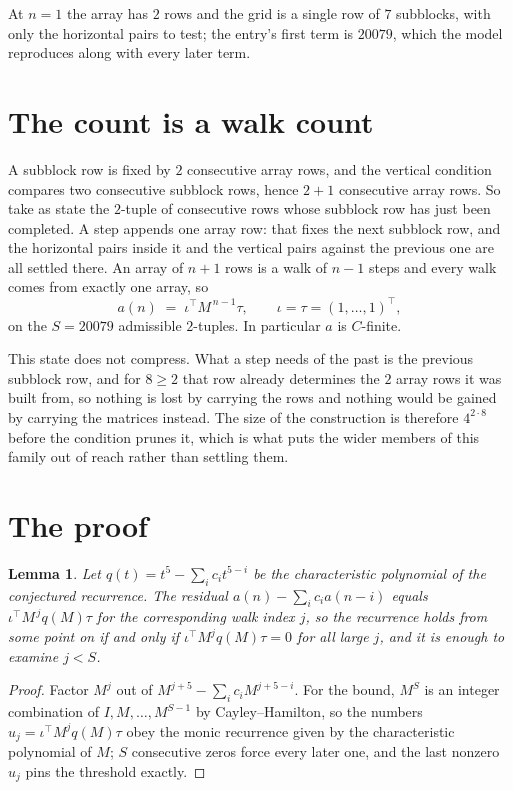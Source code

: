 \documentclass[11pt,a4paper]{article}
\theoremstyle{plain}
\newtheorem{lemma}[theorem]{Lemma}
\theoremstyle{definition}
\begin{document}
At $n=1$ the array has $2$ rows and the grid is a single row of $7$
subblocks, with only the horizontal pairs to test; the entry's first term is
$20079$, which the model reproduces along with every later term.

\section{The count is a walk count}

A subblock row is fixed by $2$ consecutive array rows, and the vertical condition compares
two consecutive subblock rows, hence $2+1$ consecutive array rows. So take as state the
$2$-tuple of consecutive rows whose subblock row has just been completed. A step appends one
array row: that fixes the next subblock row, and the horizontal pairs inside it and the
vertical pairs against the previous one are all settled there. An array of $n+1$ rows is
a walk of $n-1$ steps and every walk comes from exactly one array, so
\[
a(n)\;=\;\iota^{\!\top}M^{\,n-1}\tau,\qquad\iota=\tau=(1,\dots,1)^{\!\top},
\]
on the $S=20079$ admissible $2$-tuples. In particular $a$ is $C$-finite.

This state does not compress. What a step needs of the past is the previous subblock row, and
for $8\ge2$ that row already determines the $2$ array rows it was built from, so nothing
is lost by carrying the rows and nothing would be gained by carrying the matrices instead. The
size of the construction is therefore $4^{2\cdot8}$ before the condition prunes
it, which is what puts the wider members of this family out of reach rather than settling them.

\section{The proof}

\begin{lemma}\label{lem:crit}
Let $q(t)=t^{5}-\sum_i c_it^{5-i}$ be the characteristic polynomial of the
conjectured recurrence. The residual $a(n)-\sum_ic_ia(n-i)$ equals
$\iota^{\!\top}M^{\,j}q(M)\tau$ for the corresponding walk index $j$, so the recurrence
holds from some point on if and only if $\iota^{\!\top}M^{j}q(M)\tau=0$ for all large $j$,
and it is enough to examine $j<S$.
\end{lemma}

\begin{proof}
Factor $M^{j}$ out of $M^{j+5}-\sum_ic_iM^{j+5-i}$. For the bound, $M^{S}$
is an integer combination of $I,M,\dots,M^{S-1}$ by Cayley--Hamilton, so the numbers
$u_j=\iota^{\!\top}M^{j}q(M)\tau$ obey the monic recurrence given by the characteristic
polynomial of $M$; $S$ consecutive zeros force every later one, and the last nonzero $u_j$
pins the threshold exactly.
\end{proof}
\end{document}
